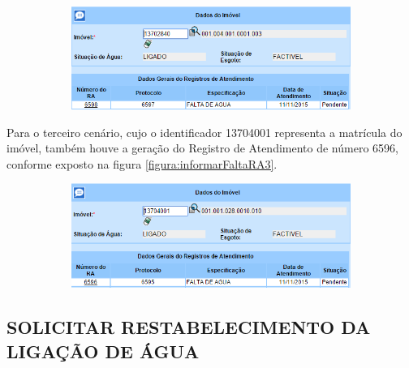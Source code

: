 \begin{figure}[H]
	\centering
	\caption{\textbf{Informar Falta de Água - RA gerado para o Cenário 2}}
	\label{figura:informarFaltaRA2}
	\begin{subfigure}[H]{\textwidth}
		\centering
		\includegraphics{figuras/cenarios/informar_falta_agua/resultado_2.PNG}
	\end{subfigure}
\end{figure}

Para o terceiro cenário, cujo o identificador 13704001 representa a matrícula do imóvel, também houve a geração do Registro de Atendimento de número 6596, conforme exposto na figura \ref{figura:informarFaltaRA3}.	

\begin{figure}[H]
	\centering
	\caption{\textbf{Informar Falta de Água - RA gerado para o Cenário 3}}
	\label{figura:informarFaltaRA3}
	\begin{subfigure}[H]{\textwidth}
		\centering
		\includegraphics{figuras/cenarios/informar_falta_agua/resultado_3.PNG}
	\end{subfigure}
\end{figure}

		
\subsection{\textbf{\uppercase{Solicitar Restabelecimento da Ligação de Água}}}

